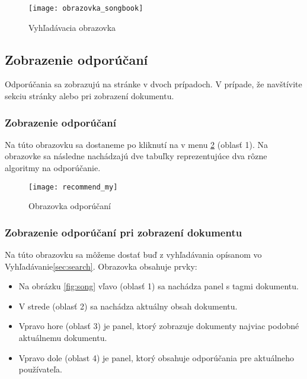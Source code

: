 \begin{figure}
    \begin{center}
        \texttt{[image: obrazovka\_songbook]}
        \caption{Vyhľadávacia obrazovka}
        \label{fig:songbook}
    \end{center}
\end{figure}

\subsection{Zobrazenie odporúčaní}

Odporúčania sa zobrazujú na stránke v dvoch prípadoch. V prípade, že navštívite 
sekciu stránky  alebo pri zobrazení dokumentu.

\subsubsection{Zobrazenie odporúčaní }

Na túto obrazovku sa dostaneme po kliknutí na  v menu \ref{fig:recommendmy}
(oblasť 1). Na obrazovke sa následne nachádzajú dve tabuľky reprezentujúce dva rôzne algoritmy
na odporúčanie.

\begin{figure}
    \begin{center}
        \texttt{[image: recommend\_my]}
        \caption{Obrazovka odporúčaní}
        \label{fig:recommendmy}
    \end{center}
\end{figure}

\subsubsection{Zobrazenie odporúčaní pri zobrazení dokumentu}

Na túto obrazovku sa môžeme dostať buď z vyhľadávania opísanom vo Vyhľadávanie\ref{sec:search}.
Obrazovka obsahuje prvky:

\begin{itemize}
\item{Na obrázku \ref{fig:song} vľavo (oblasť 1) sa nachádza panel s tagmi dokumentu.}
\item{V strede (oblasť 2) sa nachádza aktuálny obsah dokumentu.}
\item{Vpravo hore (oblasť 3) je panel, ktorý zobrazuje dokumenty najviac podobné
    aktuálnemu dokumentu.}
\item{Vpravo dole (oblast 4) je panel, ktorý obsahuje odporúčania pre aktuálneho používateľa.}
\end{itemize}


